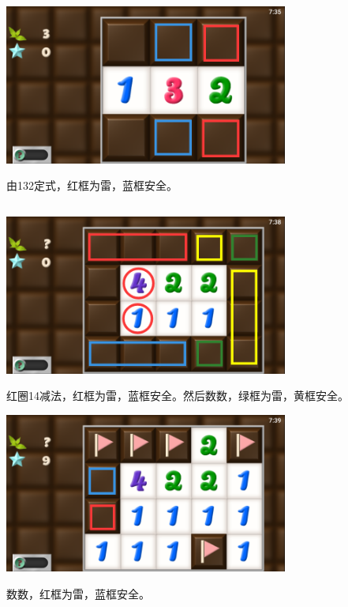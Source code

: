 \subsection{} %
\begin{center}
    \includegraphics[width=0.7\textwidth]{puzzle/8-1.png}
\end{center}
由132定式，红框为雷，蓝框安全。

\subsection{} %
\begin{center}
    \includegraphics[width=0.7\textwidth]{puzzle/9-1.png}
\end{center}
红圈14减法，红框为雷，蓝框安全。然后数数，绿框为雷，黄框安全。
\begin{center}
    \includegraphics[width=0.7\textwidth]{puzzle/9-2.png}
\end{center}
数数，红框为雷，蓝框安全。

